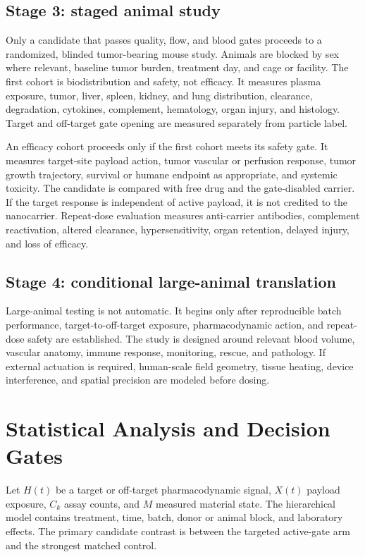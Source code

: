 \documentclass[conference]{IEEEtran}
\begin{document}
\subsection{Stage 3: staged animal study}
Only a candidate that passes quality, flow, and blood gates proceeds to a randomized, blinded tumor-bearing mouse study. Animals are blocked by sex where relevant, baseline tumor burden, treatment day, and cage or facility. The first cohort is biodistribution and safety, not efficacy. It measures plasma exposure, tumor, liver, spleen, kidney, and lung distribution, clearance, degradation, cytokines, complement, hematology, organ injury, and histology. Target and off-target gate opening are measured separately from particle label.

An efficacy cohort proceeds only if the first cohort meets its safety gate. It measures target-site payload action, tumor vascular or perfusion response, tumor growth trajectory, survival or humane endpoint as appropriate, and systemic toxicity. The candidate is compared with free drug and the gate-disabled carrier. If the target response is independent of active payload, it is not credited to the nanocarrier. Repeat-dose evaluation measures anti-carrier antibodies, complement reactivation, altered clearance, hypersensitivity, organ retention, delayed injury, and loss of efficacy.

\subsection{Stage 4: conditional large-animal translation}
Large-animal testing is not automatic. It begins only after reproducible batch performance, target-to-off-target exposure, pharmacodynamic action, and repeat-dose safety are established. The study is designed around relevant blood volume, vascular anatomy, immune response, monitoring, rescue, and pathology. If external actuation is required, human-scale field geometry, tissue heating, device interference, and spatial precision are modeled before dosing.

\section{Statistical Analysis and Decision Gates}
\label{sec:stats}
Let $H(t)$ be a target or off-target pharmacodynamic signal, $X(t)$ payload exposure, $C_k$ assay counts, and $M$ measured material state. The hierarchical model contains treatment, time, batch, donor or animal block, and laboratory effects. The primary candidate contrast is between the targeted active-gate arm and the strongest matched control.
\end{document}

